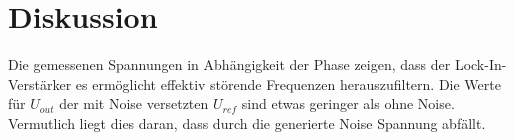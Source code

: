 \section{Diskussion}
\label{sec:Diskussion}

Die gemessenen Spannungen in Abhängigkeit der Phase zeigen, dass der Lock-In-Verstärker es ermöglicht effektiv 
störende Frequenzen herauszufiltern. Die Werte für $U_{out}$ der mit Noise versetzten $U_{ref}$ sind etwas geringer als ohne Noise.
Vermutlich liegt dies daran, dass durch die generierte Noise Spannung abfällt.




